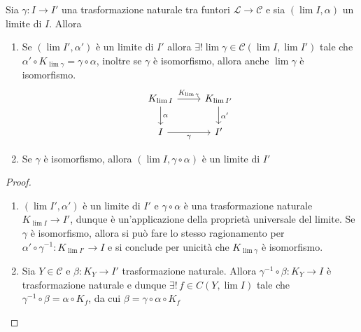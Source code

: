 \begin{proposition}{}
    Sia \(\gamma : I \to I'\) una trasformazione naturale tra funtori \(\mathcal{L} \to \mathcal{C}\) 
    e sia \({(\lim I , \alpha)}\) un limite di \(I\). Allora
\begin{enumerate}[label = \arabic*.]
    \item Se \({(\lim I ' , \alpha')}\) è un limite di \(I'\) allora \(\exists !
        \lim \gamma \in \mathcal{C}{(\lim I, \lim I')}\) tale che \(\alpha'
        \circ K_{\lim \gamma } = \gamma \circ \alpha \),
        inoltre se \(\gamma\) è isomorfismo, allora anche \(\lim \gamma\) è
        isomorfismo.
\[\begin{tikzcd}
	{K_{ \lim I}} & {K_{ \lim I'} } \\
	{I} & {I'}
	\arrow["{K_{ \lim \gamma} }", from=1-1, to=1-2]
	\arrow["{\alpha}", from=1-1, to=2-1]
	\arrow["{\alpha'}", from=1-2, to=2-2]
	\arrow["{\gamma}"', from=2-1, to=2-2]
\end{tikzcd}\]
\item Se \(\gamma\) è isomorfismo, allora \({( \lim I, \gamma \circ \alpha)}\) è
    un limite di \(I'\) 
\end{enumerate}
\end{proposition}
\begin{proof}{}
\begin{enumerate}[label = \arabic*.]
    \item \({( \lim I', \alpha')}\) è un limite
        di \(I'\) e \(\gamma \circ \alpha\) è una trasformazione naturale
        \(K_{ \lim I} \to I'\), dunque è un'applicazione della proprietà
        universale del limite. Se \(\gamma\) è isomorfismo, allora si può fare
        lo stesso ragionamento per \(\alpha' \circ \gamma^{-1} : K_{ \lim I'}
        \to I\) e si conclude per unicità che \(K_{ \lim \gamma} \) è
        isomorfismo.
    \item Sia \(Y \in \mathcal{C}\) e \(\beta : K_Y \to I'\) trasformazione naturale. Allora \(\gamma^{-1} \circ \beta : K_Y \to I\) è trasformazione naturale e dunque \(\exists !\, f \in C{(Y,  \lim I)} \) tale che \(\gamma^{-1} \circ \beta = \alpha \circ K_f\), da cui \(\beta = \gamma \circ \alpha \circ K_f\) 
\end{enumerate}
\end{proof}

